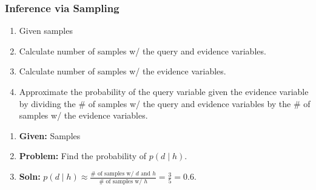 \subsubsection{Inference via Sampling}
\begin{process}
    \begin{enumerate}
        \item Given samples 
        \item Calculate number of samples w/ the query and evidence variables.
        \item Calculate number of samples w/ the evidence variables.
        \item Approximate the probability of the query variable given the evidence variable by dividing the \# of samples w/ the query and evidence variables by the \# of samples w/ the evidence variables.
    \end{enumerate}
\end{process}

\begin{example}
    \begin{enumerate}
        \item \textbf{Given:} Samples 
        \item \textbf{Problem:} Find the probability of $p(d \mid h)$.
        \item \textbf{Soln:} $p(d \mid h) \approx \frac{\# \text{ of samples w/ } d \text{ and } h}{\# \text{ of samples w/ } h} = \frac{3}{5} = 0.6$.
    \end{enumerate}
\end{example}